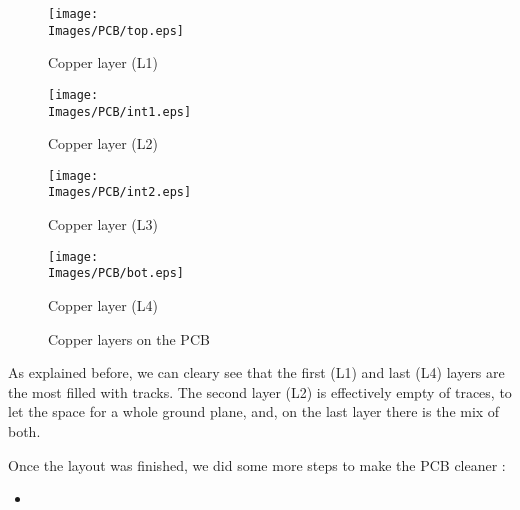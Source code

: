 \begin{figure}[!hbt]
    \centering
    \begin{minipage}[c]{\SmallSchematicWidth}
        \centering
        \texttt{[image: \\Images/PCB/top.eps]}
        \caption*{Copper layer (L1)}
    \end{minipage}%
    \hfill%
    \begin{minipage}[c]{\SmallSchematicWidth}
        \centering
        \texttt{[image: \\Images/PCB/int1.eps]}
        \caption*{Copper layer (L2)}
    \end{minipage}%
    \hfill%
    \begin{minipage}[c]{\SmallSchematicWidth}
        \centering
        \texttt{[image: \\Images/PCB/int2.eps]}
        \caption*{Copper layer (L3)}
    \end{minipage}%
    \hfill%
    \begin{minipage}[c]{\SmallSchematicWidth}
        \centering
        \texttt{[image: \\Images/PCB/bot.eps]}
        \caption*{Copper layer (L4)}
    \end{minipage}
    \label{img:layout}
    \caption{Copper layers on the PCB}
\end{figure}
\FloatBarrier

As explained before, we can cleary see that the first (L1) and last (L4) layers
are the most filled with tracks. The second layer (L2) is effectively empty of
traces, to let the space for a whole ground plane, and, on the last layer there
is the mix of both.

Once the layout was finished, we did some more steps to make the PCB cleaner :

\begin{itemize}
    \item
\end{itemize}
